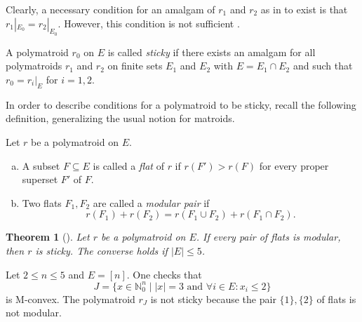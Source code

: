 \documentclass[11pt]{article}
\newtheorem{thm}[theo]{Theorem}
\theoremstyle{definition}
\numberwithin{equation}{section}
\newcommand{\N}{{\mathbb N}}
\begin{document}
Clearly, a necessary condition for an amalgam of $r_1$ and $r_2$ as in  to exist is that $r_1|_{E_0}=r_2|_{E_0}$. However, this condition is not sufficient \cite[Example~7.2.4]{oxley}.

\begin{Def}
    A polymatroid $r_0$ on $E$ is called \emph{sticky} if there exists an amalgam for all polymatroids $r_1$ and $r_2$ on finite sets $E_1$ and $E_2$ with $E=E_1\cap E_2$ and such that $r_0=r_i|_{E}$ for $i=1,2.$
\end{Def}

In order to describe conditions for a polymatroid to be sticky, recall the following definition, generalizing the usual notion for matroids.
\begin{Def}
    Let $r$ be a polymatroid on $E$.
    \begin{enumerate}[(a)]
        \item A subset $F\subseteq E$ is called a \emph{flat} of $r$ if $r(F')>r(F)$ for every proper superset $F'$ of $F$.
        \item Two flats $F_1,F_2$ are called a \emph{modular pair} if
        \begin{equation*}
            r(F_1)+r(F_2)=r(F_1\cup F_2)+r(F_1\cap F_2).
        \end{equation*}
    \end{enumerate}
\end{Def}

\begin{thm}[\cite{stickypolymatroids}]\label{thm:stickypoly}
    Let $r$ be a polymatroid on $E$. If every pair of flats is modular, then $r$ is sticky. The converse holds if $|E|\leq5$.
\end{thm}

\begin{ex}\label{ex:uniform}
 Let $2\leq n\leq5$ and $E=[n]$. One checks that
 \begin{equation*}
     J=\{x\in\N_0^n\mid |x|=3\textrm{ and }\forall i\in E: x_i\leq 2\}
 \end{equation*}
 is M-convex. The polymatroid $r_J$ is not sticky because the pair $\{1\},\{2\}$ of flats is not modular.
\end{ex}
\end{document}
